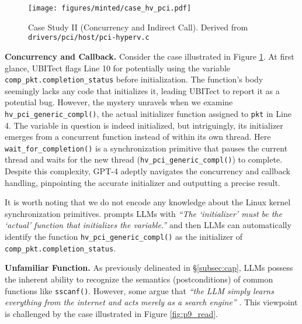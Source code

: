 \begin{figure}
\hspace{-15pt}
\texttt{[image: figures/minted/case\_hv\_pci.pdf]}
    \caption{Case Study II (Concurrency and Indirect Call). Derived from \texttt{drivers/pci/host/pci-hyperv.c}
    }
    \label{fig:hv_pci}
\end{figure}



\vspace{3pt}
\noindent
\textbf{Concurrency and Callback.} Consider the case illustrated in Figure \ref{fig:hv_pci}. At first glance, UBITect flags Line 10 for potentially using the variable \texttt{comp\_pkt.completion\_status} before initialization. The function's body seemingly lacks any code that initializes it, leading UBITect to report it as a potential bug.  However, the mystery unravels when we examine \texttt{hv\_pci\_generic\_compl()}, the actual initializer function assigned to \texttt{pkt} in Line 4. The variable in question is indeed initialized, but intriguingly, its initializer emerges from a concurrent function instead of within its own thread. Here \texttt{wait\_for\_completion()} is a synchronization primitive that pauses the current thread and waits for the new thread (\ie \texttt{hv\_pci\_generic\_compl()}) to complete.
Despite this complexity, GPT-4 adeptly navigates the concurrency and callback handling, pinpointing the accurate initializer and outputting a precise result.

It is worth noting that we do not encode any knowledge about the Linux kernel synchronization primitives. 
\work prompts LLMs with  \textit{``The `initializer' must be the `actual' function that initializes the variable.''}
and then LLMs can automatically identify the function \texttt{hv\_pci\_generic\_compl()}
as the initializer of \texttt{comp\_pkt.completion\_status}.


\vspace{3pt}
\noindent
\textbf{Unfamiliar Function.} 
As previously delineated in \S\ref{subsec:cap}, LLMs possess the inherent ability to recognize the semantics (\eg postconditions) of common functions like \texttt{sscanf()}. However, some argue that \textit{``the LLM simply learns everything from the internet and acts merely as a search engine''} \cite{chiang_chatgpt_2023}. This viewpoint is challenged by the case illustrated in Figure \ref{fig:p9_read}.

